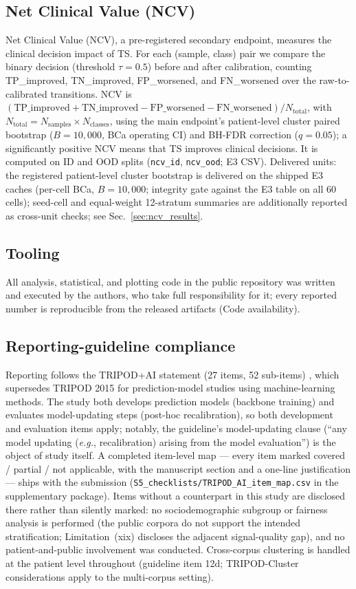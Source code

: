 \documentclass[final,5p,times,nonatbib]{elsarticle}
\begin{document}
\subsection{Net Clinical Value (NCV)}
\label{sec:ncv_methods}
Net Clinical Value (NCV), a pre-registered secondary endpoint, measures
the clinical decision impact of TS. For each (sample, class)
pair we compare the binary decision (threshold $\tau=0.5$) before and
after calibration, counting TP\_improved, TN\_improved, FP\_worsened, and
FN\_worsened over the raw-to-calibrated transitions. NCV is
$(\text{TP\_improved} + \text{TN\_improved} - \text{FP\_worsened}
- \text{FN\_worsened}) / N_{\text{total}}$, with
$N_{\text{total}} = N_{\text{samples}} \times N_{\text{classes}}$, using
the main endpoint's patient-level cluster paired bootstrap ($B=10{,}000$,
BCa operating CI) and BH-FDR correction ($q=0.05$); a significantly
positive NCV means that TS improves clinical decisions. It is computed on
ID and OOD splits (\texttt{ncv\_id}, \texttt{ncv\_ood}; E3 CSV).
Delivered units: the registered patient-level cluster bootstrap is
delivered on the shipped E3 caches (per-cell BCa, $B=10{,}000$;
integrity gate against the E3 table on all 60 cells); seed-cell and
equal-weight 12-stratum summaries are additionally reported as
cross-unit checks; see Sec.~\ref{sec:ncv_results}.

\subsection{Tooling}
\label{sec:tooling}
All analysis, statistical, and plotting code in the public repository
was written and executed by the authors, who take full responsibility
for it; every reported number is reproducible from the released
artifacts (Code availability).

\subsection{Reporting-guideline compliance}
\label{sec:reporting}
Reporting follows the TRIPOD+AI statement (27 items, 52 sub-items)
\cite{tripodai2024}, which supersedes TRIPOD 2015 for prediction-model
studies using machine-learning methods. The study both develops
prediction models (backbone training) and evaluates model-updating
steps (post-hoc recalibration), so both development and evaluation
items apply; notably, the guideline's model-updating clause
(``any model updating (\emph{e.g.}, recalibration) arising from the
model evaluation'') is the object of study itself. A completed
item-level map --- every item marked covered / partial / not
applicable, with the manuscript section and a one-line justification
--- ships with the submission
(\texttt{S5\_checklists/TRIPOD\_AI\_item\_map.csv} in the
supplementary package). Items without a counterpart in this study are
disclosed there rather than silently marked: no sociodemographic
subgroup or fairness analysis is performed (the public corpora do not
support the intended stratification; Limitation~(xix) discloses the
adjacent signal-quality gap), and no patient-and-public involvement
was conducted. Cross-corpus clustering is handled at the patient level
throughout (guideline item 12d; TRIPOD-Cluster considerations apply to
the multi-corpus setting).
\end{document}
